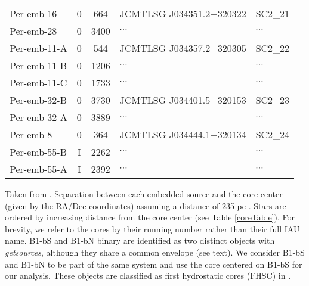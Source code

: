 \documentclass[usenatbib,a4paper]{mnras}
\begin{document}
{\begin{table*}
\begin{threeparttable}
\begin{tabular}{lccll}
\hline
Per-emb-16 		& 0 		& 664 	& JCMTLSG J034351.2+320322 	& SC2\_21 \\
Per-emb-28		& 0 		& 3400 	& $\cdots$ & $\cdots$ 		 \\
\hline
Per-emb-11-A 		& 0 		& 544 	& JCMTLSG J034357.2+320305 	& SC2\_22 \\
Per-emb-11-B 		& 0 		& 1206 	& $\cdots$ & $\cdots$ 		 \\
Per-emb-11-C 		& 0 		& 1733 	& $\cdots$ & $\cdots$ 		\\
\hline
Per-emb-32-B 		& 0 		& 3730 	& JCMTLSG J034401.5+320153 	& SC2\_23 \\
Per-emb-32-A 		& 0 		& 3889 	& $\cdots$ & $\cdots$ 		 \\
\hline
Per-emb-8 		& 0 		& 364 	& JCMTLSG J034444.1+320134 	& SC2\_24 \\
Per-emb-55-B 		& I 		& 2262  	& $\cdots$ & $\cdots$ 		 \\
Per-emb-55-A 		& I 		& 2392	& $\cdots$ & $\cdots$ 		 \\
\hline
\end{tabular}
\begin{tablenotes}
\item {} Taken from \citet{Tobin16}.   Separation between each embedded source and the core center (given by the RA/Dec coordinates) assuming a distance of 235 pc  \citep{Hirota08}.  Stars are ordered by increasing distance from the core center (see Table \ref{coreTable}).    For brevity, we refer to the cores by their running number rather than their full IAU name.  B1-bS and B1-bN binary are identified as two distinct objects with \emph{getsources}, although they share a common envelope (see text).  We consider B1-bS and B1-bN to be part of the same system and use the core centered on B1-bS for our analysis.  These objects are classified as first hydrostatic cores (FHSC) in \citet{Tobin16}.
\end{tablenotes}
\end{threeparttable}
\end{table*}	
}
\end{document}

